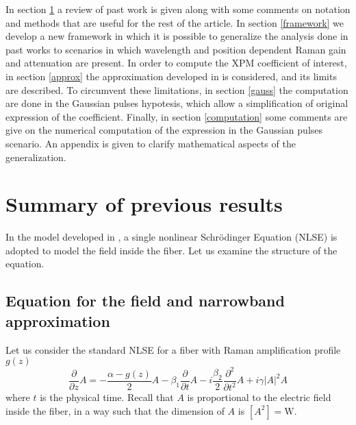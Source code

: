 \documentclass[10pt, lettersize, journal, onecolumn]{IEEEtran}
\begin{document}
In section \ref{previous} a review of past work is given along with some comments on notation and methods that are useful for the rest of the article.
In section \ref{framework} we develop a new framework in which it is possible to generalize the analysis done in past works to scenarios in which wavelength and position dependent Raman gain and attenuation are present.
In order to compute the XPM coefficient of interest, in section \ref{approx} the approximation developed in \cite{Dar_2013} is considered, and its limits are described.
To circumvent these limitations, in section \ref{gauss} the computation are done in the Gaussian pulses hypotesis, which allow a simplification of original expression of the coefficient.
Finally, in section \ref{computation} some comments are give on the numerical computation of the expression in the Gaussian pulses scenario.
An appendix is given to clarify mathematical aspects of the generalization.


\section{Summary of previous results}\label{previous}
In the model developed in \cite{Dar_2013}, a single nonlinear Schrödinger Equation (NLSE) is adopted to model the field inside the fiber. Let us examine the structure of the equation.
\subsection{Equation for the field and narrowband approximation}
    Let us consider the standard NLSE for a fiber with Raman amplification profile $g(z)$
    \begin{equation}\label{eq:nlse}
        \frac{\partial}{\partial z} A = -\frac{\alpha - g(z)}{2}A - \beta_1 \frac{\partial}{\partial t} A - i \frac{\beta_2}{2} \frac{\partial^2}{\partial t^2} A + i \gamma |A|^2 A
    \end{equation}
    where $t$ is the physical time. Recall that $A$ is proportional to the electric field inside the fiber, in a way such that the dimension of $A$ is $[A^2] = \text{W}$.
\end{document}
